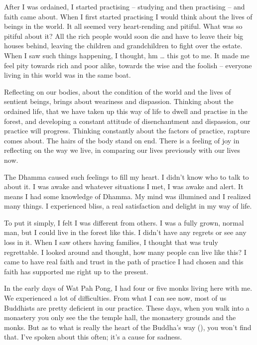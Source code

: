 After I was ordained, I started practising -- studying and then practising -- and faith came about. When I first started practising I would think about the lives of beings in the world. It all seemed very heart-rending and pitiful. What was so pitiful about it? All the rich people would soon die and have to leave their big houses behind, leaving the children and grandchildren to fight over the estate. When I saw such things happening, I thought, hm \ldots{} this got to me. It made me feel pity towards rich and poor alike, towards the wise and the foolish -- everyone living in this world was in the same boat. 

Reflecting on our bodies, about the condition of the world and the lives of sentient beings, brings about weariness and dispassion. Thinking about the ordained life, that we have taken up this way of life to dwell and practise in the forest, and developing a constant attitude of disenchantment and dispassion, our practice will progress. Thinking constantly about the factors of practice, rapture comes about. The hairs of the body stand on end. There is a feeling of joy in reflecting on the way we live, in comparing our lives previously with our lives now. 

The Dhamma caused such feelings to fill my heart. I didn't know who to talk to about it. I was awake and whatever situations I met, I was awake and alert. It means I had some knowledge of Dhamma. My mind was illumined and I realized many things. I experienced bliss, a real satisfaction and delight in my way of life. 

To put it simply, I felt I was different from others. I was a fully grown, normal man, but I could live in the forest like this. I didn't have any regrets or see any loss in it. When I saw others having families, I thought that was truly regrettable. I looked around and thought, how many people can live like this? I came to have real faith and trust in the path of practice I had chosen and this faith has supported me right up to the present. 

In the early days of Wat Pah Pong, I had four or five monks living here with me. We experienced a lot of difficulties. From what I can see now, most of us Buddhists are pretty deficient in our practice. These days, when you walk into a monastery you only see the  the temple hall, the monastery grounds and the monks. But as to what is really the heart of the Buddha's way (), you won't find that. I've spoken about this often; it's a cause for sadness. 

